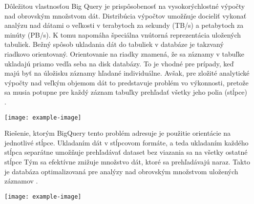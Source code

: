 Dôležitou vlastnosťou Big Query je prispôsobenosť na vysokorýchlostné výpočty nad obrovským množstvom dát.
Distribúcia výpočtov umožňuje docieliť vykonať analýzu nad dátami o veľkosti v terabytoch za sekundy (TB/s) a petabytoch za minúty (PB/s).
K tomu napomáha špeciálna vnútorná reprezentácia uložených tabuliek. 
Bežný spôsob ukladania dát do tabuliek v databáze je takzvaný riadkovo orientovaný.
Orientovanie na riadky znamená, že sa záznamy v tabuľke ukladajú priamo vedľa seba na disk databázy.
To je vhodné pre prípady, keď majú byť na úložisku záznamy hľadané individuálne.
Avšak, pre zložité analytické výpočty nad veľkým objemom dát to predstavuje problém vo výkonnosti, pretože sa musia potupne pre každý záznam tabuľky prehľadať všetky jeho polia (stĺpce) \cite{google-bq}.

\begin{center}
\noindent\texttt{[image: example-image]}    
\end{center}

Riešenie, ktorým BigQuery tento problém adresuje je použitie orientácie na jednotlivé stĺpce. 
Ukladaním dát v stĺpcovom formáte, a teda ukladaním každého stĺpca separátne umožňuje prehľadávať dataset bez viazania sa na všetky ostatné stĺpce
Tým sa efektívne znižuje množstvo dát, ktoré sa prehľadávajú naraz.
Takto je databáza optimalizovaná pre analýzy nad obrovským množstvom uložených záznamov \cite{google-bq}.

\begin{center}
\noindent\texttt{[image: example-image]}    
\end{center}

